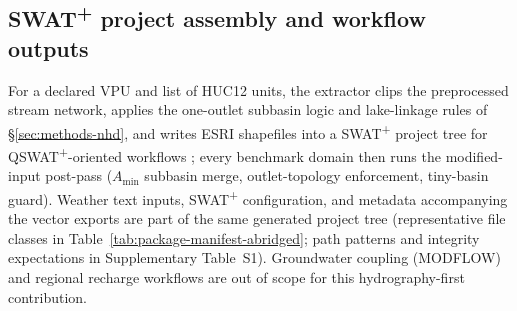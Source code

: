 \subsection{SWAT\textsuperscript{+} project assembly and workflow outputs}
\label{sec:methods-assembly}

\begin{table}[htbp]
  \centering
  \caption{Representative SWAT\textsuperscript{+} output file classes.}
  \label{tab:package-manifest-abridged}
  \small
\end{table}

For a declared VPU and list of HUC12 units, the extractor clips the preprocessed stream network, applies the one-outlet subbasin logic and lake-linkage rules of \S\ref{sec:methods-nhd}, and writes ESRI shapefiles into a SWAT\textsuperscript{+} project tree for QSWAT\textsuperscript{+}-oriented workflows \citep{QSWATplusSoftware}; every benchmark domain then runs the modified-input post-pass ($A_{\min}$ subbasin merge, outlet-topology enforcement, tiny-basin guard). Weather text inputs, SWAT\textsuperscript{+} configuration, and metadata accompanying the vector exports are part of the same generated project tree (representative file classes in Table~\ref{tab:package-manifest-abridged}; path patterns and integrity expectations in Supplementary Table~S1). Groundwater coupling (MODFLOW) and regional recharge workflows are out of scope for this hydrography-first contribution.

